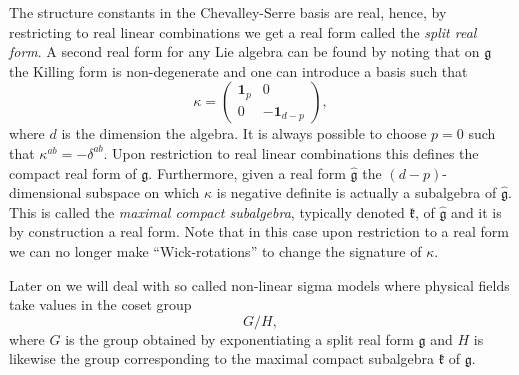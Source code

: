 The structure constants in the Chevalley-Serre basis are real, hence, by restricting to real linear combinations we get a real form called the \emph{split real form}. A second real form for any Lie algebra can be found by noting that on $\mathfrak{g}$ the Killing form is non-degenerate and one can introduce a basis such that 
\begin{equation}
    \kappa = \begin{pmatrix}\mathbf{1}_p& 0\\0&-\mathbf{1}_{d-p}
    \end{pmatrix},
\end{equation}
where $d$ is the dimension the algebra. It is always possible to choose $p=0$ such that $\kappa^{ab} = -\delta^{ab}$. Upon restriction to real linear combinations this defines the compact real form of $\mathfrak{g}$. Furthermore, given a real form $\hat{\mathfrak{g}}$ the $(d-p)$-dimensional subspace on which $\kappa$ is negative definite is actually a subalgebra of $\hat{\mathfrak{g}}$. This is called the \emph{maximal compact subalgebra}, typically denoted $\mathfrak{k}$, of $\hat{\mathfrak{g}}$ and it is by construction a real form. Note that in this case upon restriction to a real form we can no longer make ``Wick-rotations'' to change the signature of $\kappa$.

Later on we will deal with so called non-linear sigma models where physical fields take values in the coset group
\begin{equation}
G/H,
\end{equation}
where $G$ is the group obtained by exponentiating a split real form $\mathfrak{g}$ and $H$ is likewise the group corresponding to the maximal compact subalgebra $\mathfrak{k}$ of $\mathfrak{g}$.  


